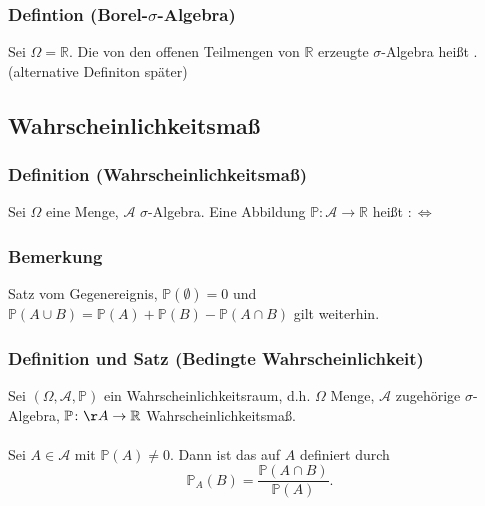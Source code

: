\subsubsection{Defintion (Borel-$\sigma$-Algebra)}
Sei $\Omega=\mathbb{R}$. Die von den offenen Teilmengen von $\mathbb{R}$ erzeugte $\sigma$-Algebra hei\ss{}t . (alternative Definiton sp\"ater)
\subsection{Wahrscheinlichkeitsma\ss{}}
\subsubsection{Definition (Wahrscheinlichkeitsma\ss{})}
Sei $\Omega$ eine Menge, $\mathcal{A}$ $\sigma$-Algebra. Eine Abbildung $\mathbb{P}\colon\mathcal{A}\to\mathbb{R}$ hei\ss{}t  $:\Leftrightarrow$
\subsubsection{Bemerkung}
Satz vom Gegenereignis, $\mathbb{P}(\emptyset)=0$ und $\mathbb{P}(A\cup B)=\mathbb{P}(A)+\mathbb{P}(B)-\mathbb{P}(A\cap B)$ gilt weiterhin.
\subsubsection{Definition und Satz (Bedingte Wahrscheinlichkeit)}
Sei $(\Omega,\mathcal{A},\mathbb{P})$ ein Wahrscheinlichkeitsraum, d.h. $\Omega$ Menge, $\mathcal{A}$ zugeh\"orige $\sigma$-Algebra, $\mathbb{P}\colon\AA\to\mathbb{R}$ Wahrscheinlichkeitsma\ss{}.
\\~\\
Sei $A\in\mathcal{A}$ mit $\mathbb{P}(A)\neq0$. Dann ist das auf $A$  definiert durch
\[
\mathbb{P}_A(B)=\frac{\mathbb{P}(A\cap B)}{\mathbb{P}(A)}.
\]
